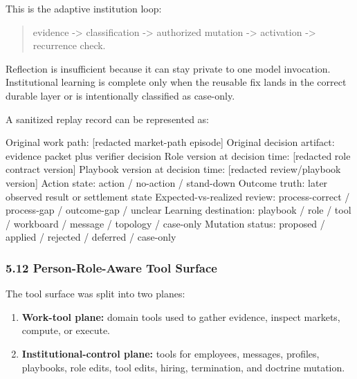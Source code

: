 \documentclass[
]{article}
\newenvironment{Shaded}{}{}
\newcommand{\NormalTok}[1]{#1}
\providecommand{\tightlist}{%
  \setlength{\itemsep}{0pt}\setlength{\parskip}{0pt}}
\begin{document}
This is the adaptive institution loop:

\begin{quote}
evidence -\textgreater{} classification -\textgreater{} authorized mutation -\textgreater{} activation -\textgreater{} recurrence check.
\end{quote}

Reflection is insufficient because it can stay private to one model invocation. Institutional learning is complete only when the reusable fix lands in the correct durable layer or is intentionally classified as case-only.

A sanitized replay record can be represented as:

\begin{Shaded}
\begin{Highlighting}[]
\NormalTok{Original work path: [redacted market{-}path episode]}
\NormalTok{Original decision artifact: evidence packet plus verifier decision}
\NormalTok{Role version at decision time: [redacted role contract version]}
\NormalTok{Playbook version at decision time: [redacted review/playbook version]}
\NormalTok{Action state: action / no{-}action / stand{-}down}
\NormalTok{Outcome truth: later observed result or settlement state}
\NormalTok{Expected{-}vs{-}realized review: process{-}correct / process{-}gap / outcome{-}gap / unclear}
\NormalTok{Learning destination: playbook / role / tool / workboard / message / topology / case{-}only}
\NormalTok{Mutation status: proposed / applied / rejected / deferred / case{-}only}
\end{Highlighting}
\end{Shaded}

\subsubsection{5.12 Person-Role-Aware Tool Surface}\label{person-role-aware-tool-surface}

The tool surface was split into two planes:

\begin{enumerate}
\def\labelenumi{\arabic{enumi}.}
\tightlist
\item
  \textbf{Work-tool plane:} domain tools used to gather evidence, inspect markets, compute, or execute.
\item
  \textbf{Institutional-control plane:} tools for employees, messages, profiles, playbooks, role edits, tool edits, hiring, termination, and doctrine mutation.
\end{enumerate}
\end{document}
